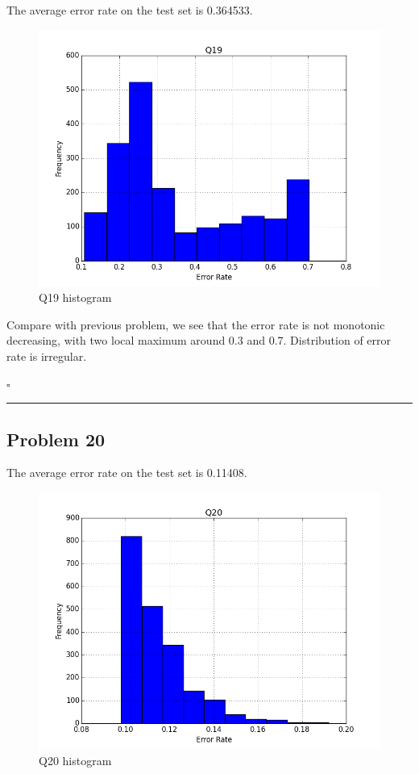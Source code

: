 \documentclass[12pt]{article}
\newcommand*{\QEDB}{\hfill\ensuremath{\square}}
\newcommand{\horrule}[1]{\rule{\linewidth}{#1}}
\begin{document}
The average error rate on the test set is 0.364533.
\begin{figure}[h]
\centering
\includegraphics[scale=0.3]{Q19}
\caption{Q19 histogram}
\label{Q19}
\end{figure}
Compare with previous problem, we see that the error rate is not monotonic decreasing, with two local maximum around 0.3 and 0.7. Distribution of error rate is irregular.

\QEDB

\horrule{0.5pt}

\subsection*{Problem 20}

The average error rate on the test set is 0.11408.
\begin{figure}[h]
\centering
\includegraphics[scale=0.3]{Q20}
\caption{Q20 histogram}
\label{Q20}
\end{figure}
\end{document}

